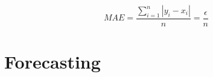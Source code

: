 \documentclass[%
    corpo=12pt,
    twoside,
    oldstyle,
    autoretitolo,
    greek,
    evenboxes,
]{toptesi}
\begin{document}
\begin{center}
  \begin{equation}
    MAE = \frac{\sum_{i=1}^{n}{|y_{i} - x_{i}|}}{n} = \frac{\epsilon}{n}
  \end{equation}
\end{center}



\chapter{Forecasting}
\label{chap:forecasting}


\end{document}
